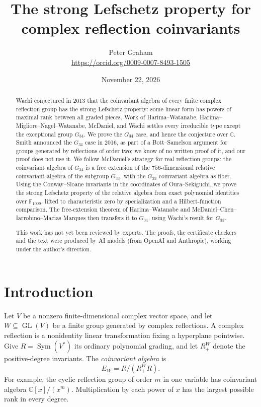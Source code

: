 \documentclass[11pt]{article}
\title{The strong Lefschetz property for complex reflection coinvariants}
\author{Peter Graham\\ \small\url{https://orcid.org/0009-0007-8493-1505}}
\date{November 22, 2026}
\theoremstyle{definition}
\newcommand{\C}{\mathbb C}
\newcommand{\F}{\mathbb F}
\newcommand{\Sym}{\operatorname{Sym}}
\begin{document}
\maketitle
\begin{abstract}
Wachi conjectured in 2013 that the coinvariant algebra of every finite
complex reflection group has the strong Lefschetz property: some linear
form has powers of maximal rank between all graded pieces. Work of
Harima--Watanabe, Harima--Migliore--Nagel--Watanabe, McDaniel, and Wachi
settles every irreducible type except the exceptional group $G_{34}$. We
prove the $G_{34}$ case, and hence the conjecture over $\C$. Smith
announced the $G_{34}$ case in 2016, as part of a Bott--Samelson argument
for groups generated by reflections of order two; we know of no written
proof of it, and our proof does not use it. We follow McDaniel's strategy
for real reflection groups: the coinvariant algebra of $G_{34}$ is a free
extension of the $756$-dimensional relative coinvariant algebra of the
subgroup $G_{33}$, with the $G_{33}$ coinvariant algebra as fiber. Using
the Conway--Sloane invariants in the coordinates of Oura--Sekiguchi, we
prove the strong Lefschetz property of the relative algebra from exact
polynomial identities over $\F_{1009}$, lifted to characteristic zero by
specialization and a Hilbert-function comparison. The free-extension
theorem of Harima--Watanabe and McDaniel--Chen--Iarrobino--Macias Marques
then transfers it to $G_{34}$, using Wachi's result for $G_{33}$.

This work has not yet been reviewed by experts. The proofs, the certificate checkers and the text were produced by AI models (from OpenAI and Anthropic), working under the author's direction.
\end{abstract}
\medskip


\section{Introduction}
Let $V$ be a nonzero finite-dimensional complex vector space, and let
$W\subseteq\operatorname{GL}(V)$ be a finite group generated by complex
reflections. A complex reflection is a nonidentity linear transformation fixing a
hyperplane pointwise. Give
$R=\Sym(V^*)$ its ordinary polynomial grading, and let $R^W_+$ denote the
positive-degree invariants. The \emph{coinvariant algebra} is
\[
                         E_W=R/(R^W_+R).
\]
For example, the cyclic reflection group of order $m$ in one variable
has coinvariant algebra $\C[x]/(x^m)$. Multiplication by each power of
$x$ has the largest possible rank in every degree.
\end{document}
